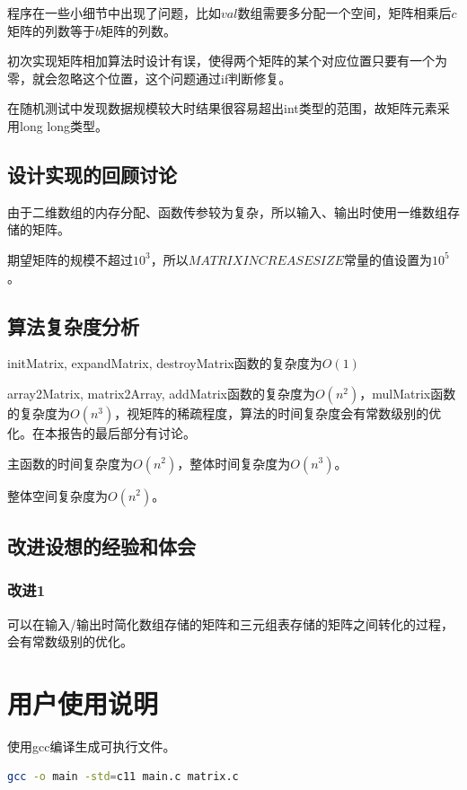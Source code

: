 \documentclass{article}
\begin{document}
程序在一些小细节中出现了问题，比如$val$数组需要多分配一个空间，矩阵相乘后$c$矩阵的列数等于$b$矩阵的列数。

初次实现矩阵相加算法时设计有误，使得两个矩阵的某个对应位置只要有一个为零，就会忽略这个位置，这个问题通过if判断修复。

在随机测试中发现数据规模较大时结果很容易超出int类型的范围，故矩阵元素采用long long类型。

\subsection{设计实现的回顾讨论}

由于二维数组的内存分配、函数传参较为复杂，所以输入、输出时使用一维数组存储的矩阵。

期望矩阵的规模不超过$10^3$，所以$MATRIXINCREASESIZE$常量的值设置为$10^5$。

\subsection{算法复杂度分析}

initMatrix, expandMatrix, destroyMatrix函数的复杂度为$O(1)$

array2Matrix, matrix2Array, addMatrix函数的复杂度为$O(n^2)$，mulMatrix函数的复杂度为$O(n^3)$，视矩阵的稀疏程度，算法的时间复杂度会有常数级别的优化。在本报告的最后部分有讨论。

主函数的时间复杂度为$O(n^2)$，整体时间复杂度为$O(n^3)$。

整体空间复杂度为$O(n^2)$。

\subsection{改进设想的经验和体会}

\subsubsection{改进1}

可以在输入/输出时简化数组存储的矩阵和三元组表存储的矩阵之间转化的过程，会有常数级别的优化。

\section{用户使用说明}

使用gcc编译生成可执行文件。

\begin{lstlisting}[language={bash},
    basicstyle=\small\consolas]
gcc -o main -std=c11 main.c matrix.c
\end{lstlisting}
\end{document}

